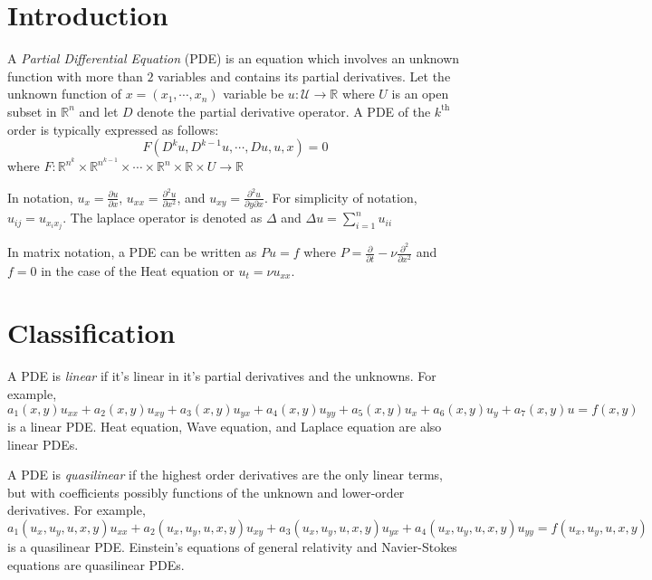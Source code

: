 \documentclass[12pt]{article}
\begin{document}
	\MakeScribeTop

\section{Introduction } \label{sec:pde}

A \textit{Partial Differential Equation} (PDE) is an equation which involves an unknown function with more than $2$ variables and contains its partial derivatives. Let the unknown function of $x = (x_1, \cdots, x_n)$ variable be $u: \mathcal{U} \to \mathbb{R}$ where $U$ is an open subset in $\mathbb{R}^n$ and let $D$ denote the partial derivative operator. A PDE of the $k^{\text{th}}$ order is typically expressed as follows:
$$F\left(D^ku, D^{k - 1}u, \cdots, Du, u, x\right) = 0$$
where $F: \mathbb{R}^{n^k} \times \mathbb{R}^{n^{k - 1}} \times \cdots \times \mathbb{R}^n \times \mathbb{R} \times U \to \mathbb{R}$

In notation, $u_x = \frac{\partial u}{\partial x}$, $u_{xx} = \frac{\partial^2 u}{\partial x^2}$, and $u_{xy} = \frac{\partial^2 u}{\partial y \partial x}$. For simplicity of notation, $u_{ij} = u_{x_ix_j}$. The laplace operator is denoted as $\Delta$ and $\Delta u = \sum_{i = 1}^n u_{ii}$

In matrix notation, a PDE can be written as $P u = f$ where $P = \frac{\partial }{\partial t } -\nu \frac{\partial^2 }{\partial x^2 } $ and $f = 0$ in the case of the Heat equation or $u_t = \nu u_{xx}$. 

\section{Classification} \label{sec:classification}

A PDE is \textit{linear} if it's linear in it's partial derivatives and the unknowns. For example, 
$$a_1(x, y)u_{xx} + a_2(x, y)u_{xy} + a_3(x, y)u_{yx} + a_4(x, y)u_{yy} + a_5(x, y)u_{x} + a_6(x, y)u_{y} + a_7(x, y)u = f(x, y)$$
is a linear PDE. Heat equation, Wave equation, and Laplace equation are also linear PDEs.


A PDE is \textit{quasilinear} if the highest order derivatives are the only linear terms, but with coefficients possibly functions of the unknown and lower-order derivatives.
For example,
$$a_1(u_x, u_y, u, x, y)u_{xx} + a_2(u_x, u_y, u, x, y)u_{xy} + a_3(u_x, u_y, u, x, y)u_{yx} + a_4(u_x, u_y, u, x, y)u_{yy}  = f(u_x, u_y, u, x, y)$$
is a quasilinear PDE. Einstein's equations of general relativity and Navier-Stokes equations are quasilinear PDEs.
\end{document}
